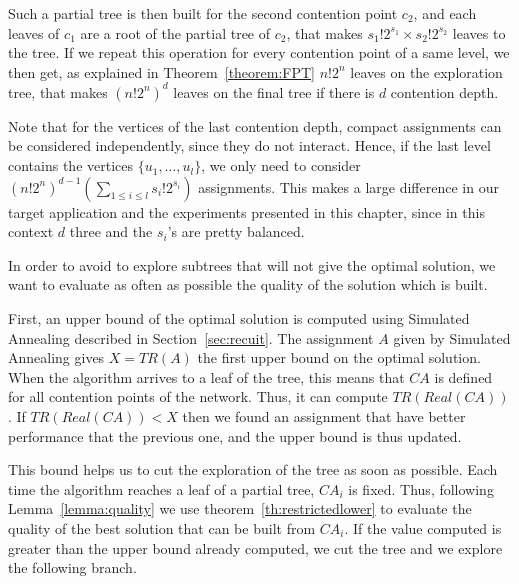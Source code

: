 Such a partial tree is then built for the second contention point $c_2$, and each leaves of $c_1$ are a root of the partial tree of $c_2$, that makes $s_1!2^{s_1} \times s_2!2^{s_2}$ leaves to the tree. If we repeat this operation for every contention point of a same level, we then get, as explained in Theorem~\ref{theorem:FPT} $n!2^n$ leaves on the exploration tree, that makes $ (n!2^{n})^{d}$ leaves on the final tree if there is $d$ contention depth.

Note that for the vertices of the last contention depth, compact assignments can be considered independently, since
they do not interact. Hence, if the last level contains the vertices $\{u_1,\dots,u_l\}$, we only need to consider $(n!2^{n})^{d-1}(\sum_{1 \leq i\leq l} s_{i}!2^{s_i})$ assignments. This makes a large difference in our target application and the experiments presented in this chapter, since in this context $d$ three and the $s_i$'s are pretty balanced.


In order to avoid to explore subtrees that will not give the optimal solution, we want to evaluate as often as possible the quality of the solution which is built.

First, an upper bound of the optimal solution is computed using Simulated Annealing described in Section~\ref{sec:recuit}. The assignment $A$ given by Simulated Annealing gives $X =TR(A)$ the first upper bound on the optimal solution.
When the algorithm arrives to a leaf of the tree, this means that $CA$ is defined for all contention points of the network. Thus, it can compute $TR(Real(CA))$. If $TR(Real(CA)) < X$ then we found an assignment that have better performance that the previous one, and the upper bound is thus updated.

This bound helps us to cut the exploration of the tree as soon as possible. Each time the algorithm reaches a leaf of a partial tree, $CA_i$ is fixed. Thus, following Lemma~\ref{lemma:quality} we use theorem~\ref{th:restrictedlower} to evaluate the quality of the best solution that can be built from $CA_i$. If the value computed is greater than the upper bound already computed, we cut the tree and we explore the following branch.







